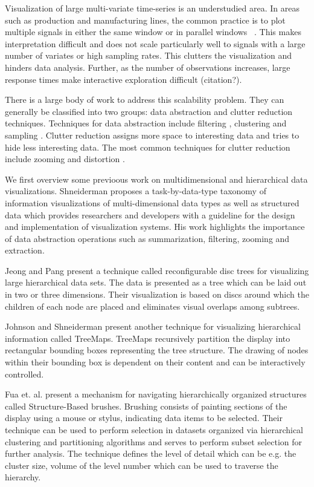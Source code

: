 
Visualization of large multi-variate time-series is an understudied area. In areas such as production and manufacturing lines, the common practice is to plot multiple signals in either the same window or in parallel windows~\cite{} . This makes interpretation difficult and does not scale particularly well to signals with a large number of variates or high sampling rates. %
This clutters the visualization and hinders data analysis. Further, as the number of observations increases,
 large response times make interactive exploration difficult (citation?).

There is a large body of work to address this scalability problem.
They can generally be classified into two groups: data abstraction and clutter reduction 
techniques. Techniques for data abstraction include filtering , clustering
and sampling \cite{553159}. Clutter reduction assigns more space to interesting data and tries to hide less interesting data.
The most common techniques for clutter reduction include zooming and distortion \cite{559215,1382895,1196005}.


We first overview some previoous work on multidimensional and hierarchical data visualizations. 
Shneiderman \cite{545307} proposes a task-by-data-type taxonomy of information visualizations of multi-dimensional
data types as well as structured data which provides researchers and developers with a guideline for
the design and implementation of visualization systems. His work highlights the importance of data
abstraction operations such as summarization, filtering, zooming and extraction.

Jeong and Pang \cite{729555} present a technique called reconfigurable disc trees for visualizing large 
hierarchical data sets. The data is presented as a tree which can be laid out in two or three dimensions.
Their visualization is based on discs around which the children of each node are placed and eliminates
visual overlaps among subtrees.

Johnson and Shneiderman \cite{Johnson:1991:TSA:949607.949654} present another technique for visualizing hierarchical
information called TreeMaps. TreeMaps recursively partition the display into rectangular bounding boxes representing the 
tree structure. The drawing of nodes within their bounding box is dependent on their content and can be interactively
controlled.

Fua et. al. \cite{Fua:2000:SBM:614278.614457} present a mechanism for navigating hierarchically organized structures
called Structure-Based brushes. Brushing consists of painting sections of the display using a mouse or stylus, indicating
data items to be selected. Their technique can be used to perform selection in datasets organized via hierarchical
clustering and partitioning algorithms and serves to perform subset selection for further analysis. The technique defines
the level of detail which can be e.g. the cluster size, volume of the level number which can be used to traverse the
hierarchy.

